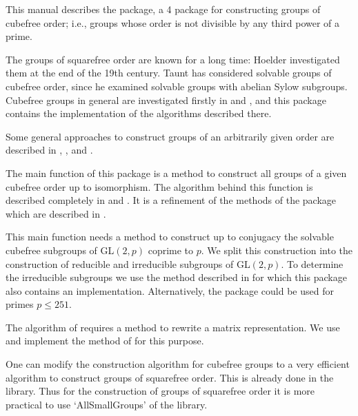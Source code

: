



This manual describes the {\Cubefree}  package,
a {\GAP} 4 package for constructing groups of cubefree order; i.e., groups
whose order is not divisible by any third power of a prime.

The groups of squarefree order are known for a long time: Hoelder
\cite{Hol93} investigated them at the end of the 19th century. Taunt
\cite{Tau55} has considered solvable groups of cubefree order, since he
examined solvable groups with abelian Sylow subgroups. Cubefree groups in
general are investigated firstly in \cite{Di05} and \cite{DiEi05}, and this
package contains the implementation of the algorithms described
there.

Some general approaches to construct groups of an arbitrarily given order are
described in \cite{BeEia}, \cite{BeEib}, and \cite{BeEiO}.

The main function of this package is a method to construct 
all groups of a given cubefree order up to isomorphism. The algorithm behind this function is
described completely in \cite{Di05} and \cite{DiEi05}. It is a refinement of
the methods of the {\GrpConst} package which are described in \cite{GrpConst}.

This main function needs a method to construct up to conjugacy the solvable
cubefree subgroups of GL$(2,p)$ coprime to $p$. We split this construction
into the construction of reducible and irreducible subgroups of GL$(2,p)$. To determine the
irreducible subgroups we use the method described in \cite{FlOB05} for which this package
also contains an implementation. Alternatively, the {\IrredSol} package
\cite{Irredsol} could be used for primes $p\le 251$.

The algorithm of \cite{FlOB05} requires a method to rewrite a matrix
representation. We use and implement the method of \cite{GlHo97} for this purpose.

One can modify the construction algorithm for cubefree groups to a very
efficient algorithm to construct groups of squarefree order. This is already
done in the  {\SmallGroups} library. Thus for the construction of groups of squarefree order it is more practical to
use `AllSmallGroups' of the {\SmallGroups} library. 


